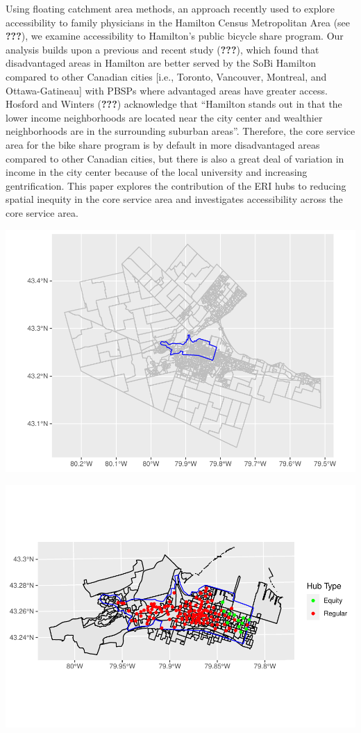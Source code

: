 \documentclass[]{elsarticle} %
\begin{document}
Using floating catchment area methods, an approach recently used to
explore accessibility to family physicians in the Hamilton Census
Metropolitan Area (see {\textbf{???}}), we examine accessibility to
Hamilton's public bicycle share program. Our analysis builds upon a
previous and recent study ({\textbf{???}}), which found that
disadvantaged areas in Hamilton are better served by the SoBi Hamilton
compared to other Canadian cities {[}i.e., Toronto, Vancouver, Montreal,
and Ottawa-Gatineau{]} with PBSPs where advantaged areas have greater
access. Hosford and Winters ({\textbf{???}}) acknowledge that ``Hamilton
stands out in that the lower income neighborhoods are located near the
city center and wealthier neighborhoods are in the surrounding suburban
areas''. Therefore, the core service area for the bike share program is
by default in more disadvantaged areas compared to other Canadian
cities, but there is also a great deal of variation in income in the
city center because of the local university and increasing
gentrification. This paper explores the contribution of the ERI hubs to
reducing spatial inequity in the core service area and investigates
accessibility across the core service area.

\includegraphics{Bike-share-spatial-equity_files/figure-latex/unnamed-chunk-4-1.pdf}

\includegraphics{Bike-share-spatial-equity_files/figure-latex/unnamed-chunk-6-1.pdf}
\end{document}
